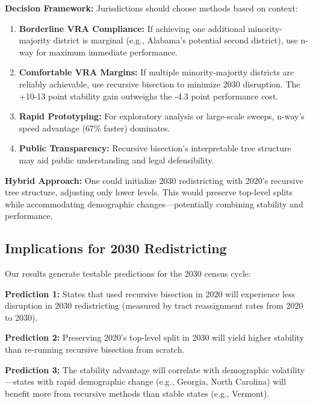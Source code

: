 \textbf{Decision Framework:} Jurisdictions should choose methods based on context:

\begin{enumerate}
    \item \textbf{Borderline VRA Compliance:} If achieving one additional minority-majority district is marginal (e.g., Alabama's potential second district), use n-way for maximum immediate performance.

    \item \textbf{Comfortable VRA Margins:} If multiple minority-majority districts are reliably achievable, use recursive bisection to minimize 2030 disruption. The +10-13 point stability gain outweighs the -4.3 point performance cost.

    \item \textbf{Rapid Prototyping:} For exploratory analysis or large-scale sweeps, n-way's speed advantage (67\% faster) dominates.

    \item \textbf{Public Transparency:} Recursive bisection's interpretable tree structure may aid public understanding and legal defensibility.
\end{enumerate}

\textbf{Hybrid Approach:} One could initialize 2030 redistricting with 2020's recursive tree structure, adjusting only lower levels. This would preserve top-level splits while accommodating demographic changes—potentially combining stability and performance.

\subsection{Implications for 2030 Redistricting}

Our results generate testable predictions for the 2030 census cycle:

\textbf{Prediction 1:} States that used recursive bisection in 2020 will experience less disruption in 2030 redistricting (measured by tract reassignment rates from 2020 to 2030).

\textbf{Prediction 2:} Preserving 2020's top-level split in 2030 will yield higher stability than re-running recursive bisection from scratch.

\textbf{Prediction 3:} The stability advantage will correlate with demographic volatility—states with rapid demographic change (e.g., Georgia, North Carolina) will benefit more from recursive methods than stable states (e.g., Vermont).

